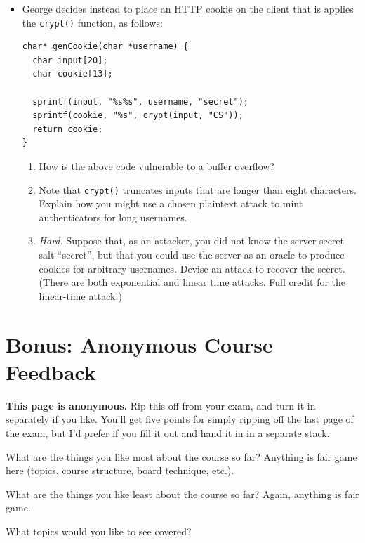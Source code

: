 \documentclass[11pt]{article}
\newcounter{pctr}
\newcommand\prob[1]%
  {\begin{itemize}\item[]%
   \vspace{.2in}{\bf\thepctr. ~[#1~ points]:}\stepcounter{pctr}}
\newcommand\eprob{\end{itemize}}
\begin{document}
\newpage
\prob{8} George decides instead to place an HTTP cookie on the client
that is applies the {\tt crypt()} function, as follows:
\begin{verbatim}
char* genCookie(char *username) {
  char input[20];
  char cookie[13];

  sprintf(input, "%s%s", username, "secret");
  sprintf(cookie, "%s", crypt(input, "CS"));
  return cookie;
}
\end{verbatim}
\begin{enumerate}
\item How is the above code vulnerable to a buffer overflow?
\item Note that {\tt crypt()} truncates inputs that are longer than
  eight characters.  Explain how you might use a chosen plaintext attack
  to mint authenticators for long usernames.
\item {\em Hard.} Suppose that, as an attacker, you did not know the
  server secret salt ``secret'', but that you could use the server as an
  oracle to produce cookies for arbitrary usernames.  Devise an attack
  to recover the secret.  (There are both exponential and linear time
  attacks.  Full credit for the linear-time attack.)
\end{enumerate}


\eprob

\newpage
\section{Bonus: Anonymous Course Feedback}

{\bf This page is anonymous.}  Rip this off from your exam, and turn it
in separately if you like.  You'll get five points for simply ripping
off the last page of the exam, but I'd prefer if you fill it out and
hand it in in a separate stack.
\vspace{.5in}

What are the things you like most about the course so far?  Anything is
fair game here (topics, course structure, board technique, etc.).
\vspace{1.5in}


What are the things you like least about the course so far?  Again,
anything is fair game.
\vspace{1in}


What topics would you like to see covered?
\vspace{1in}



\label{lastpage}
\end{document}
